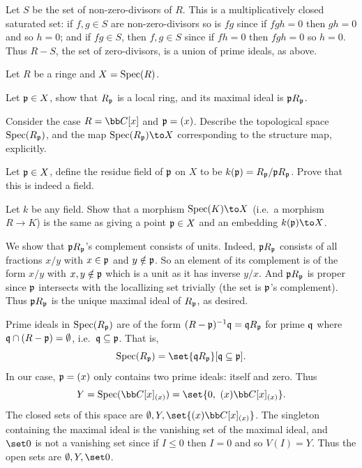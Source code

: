         \item Let $S$ be the set of non-zero-divisors of $R$.
        This is a multiplicatively closed saturated set: if $f,g\in S$ are non-zero-divisors so is $fg$ since if $fgh=0$ then $gh=0$ and so $h=0$;
        and if $fg\in S$, then $f,g\in S$ since if $fh=0$ then $fgh=0$ so $h=0$.
        Thus $R-S$, the set of zero-divisors, is a union of prime ideals, as above.
    \eenum
\eenum

\bprob

    Let $R$ be a ringe and $X={\rm Spec}(R)$.
    \benum
        \item Let ${{\frak p}}\in X$, show that $R_{{\frak p}}$ is a local ring, and its maximal ideal is ${{\frak p}} R_{{\frak p}}$.
        \item Consider the case $R=\bC[x]$ and ${{\frak p}}=(x)$.
        Describe the topological space ${\rm Spec}(R_{{\frak p}})$, and the map $\spec(R_\p)\to X$ corresponding to the structure map, explicitly.
        \item Let ${{\frak p}}\in X$, define the {\emphcolor residue field} of ${{\frak p}}$ on $X$ to be $k({{\frak p}})=R_{{\frak p}}/{{\frak p}} R_{{\frak p}}$.
        Prove that this is indeed a field.
        \item Let $k$ be any field.
        Show that a morphism $\spec(K)\to X$ (i.e.\ a morphism $R\to K$) is the same as giving a point ${{\frak p}}\in X$ and an embedding $k(\p)\to X$.
    \eenum

\eprob

\benum
    \item We show that ${{\frak p}} R_{{\frak p}}$'s complement consists of units.
    Indeed, ${{\frak p}} R_{{\frak p}}$ consists of all fractions $x/y$ with $x\in{{\frak p}}$ and $y\notin{{\frak p}}$.
    So an element of its complement is of the form $x/y$ with $x,y\notin{{\frak p}}$ which is a unit as it has inverse $y/x$.
    And ${{\frak p}} R_{{\frak p}}$ is proper since ${{\frak p}}$ intersects with the locallizing set trivially (the set is ${{\frak p}}$'s complement).
    Thus ${{\frak p}} R_{{\frak p}}$ is the unique maximal ideal of $R_{{\frak p}}$, as desired.

    \item Prime ideals in ${\rm Spec}(R_{{\frak p}})$ are of the form $(R-{{\frak p}})^{-1}{{\frak q}}={{\frak q}} R_{{\frak p}}$ for prime ${{\frak q}}$ where ${{\frak q}}\cap(R-{{\frak p}})=\emptyset$, i.e.\ ${{\frak q}}\subseteq{{\frak p}}$.
    That is,
    $$ \spec(R_\p) = \set{\q R_\p}[\q\subseteq\p] . $$
    In our case, ${{\frak p}}=(x)$ only contains two prime ideals: itself and zero.
    Thus
    $$ Y = \spec(\bC[x]_{(x)}) = \set{0,\ (x)\bC[x]_{(x)}} . $$
    The closed sets of this space are $\emptyset,Y,\set{(x)\bC[x]_{(x)}}$.
    The singleton containing the maximal ideal is the vanishing set of the maximal ideal, and $\set0$ is not a vanishing set since if $I\leq0$ then $I=0$ and
    so $V(I)=Y$.
    Thus the open sets are $\emptyset,Y,\set0$.

